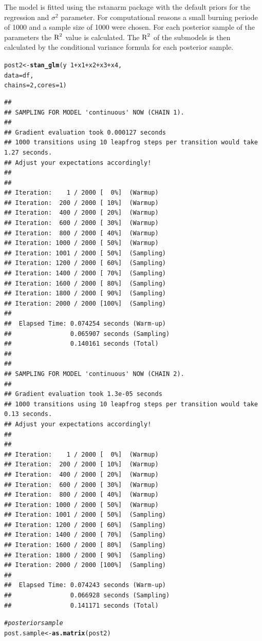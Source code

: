 \documentclass[11pt,a4paper,twoside]{book}\usepackage[]{graphicx}\usepackage[]{color}
\makeatletter
\newcommand{\hlnum}[1]{\textcolor[rgb]{0.686,0.059,0.569}{#1}}%
\newcommand{\hlcom}[1]{\textcolor[rgb]{0.678,0.584,0.686}{\textit{#1}}}%
\newcommand{\hlopt}[1]{\textcolor[rgb]{0,0,0}{#1}}%
\newcommand{\hlstd}[1]{\textcolor[rgb]{0.345,0.345,0.345}{#1}}%
\newcommand{\hlkwb}[1]{\textcolor[rgb]{0.69,0.353,0.396}{#1}}%
\newcommand{\hlkwc}[1]{\textcolor[rgb]{0.333,0.667,0.333}{#1}}%
\newcommand{\hlkwd}[1]{\textcolor[rgb]{0.737,0.353,0.396}{\textbf{#1}}}%
\newenvironment{kframe}{%
 \def\at@end@of@kframe{}%
 \ifinner\ifhmode%
  \def\at@end@of@kframe{\end{minipage}}%
  \begin{minipage}{\columnwidth}%
 \fi\fi%
 \def\FrameCommand##1{\hskip\@totalleftmargin \hskip-\fboxsep
 \colorbox{shadecolor}{##1}\hskip-\fboxsep
     \hskip-\linewidth \hskip-\@totalleftmargin \hskip\columnwidth}%
 \MakeFramed {\advance\hsize-\width
   \@totalleftmargin\z@ \linewidth\hsize
   \@setminipage}}%
 {\par\unskip\endMakeFramed%
 \at@end@of@kframe}
\newenvironment{knitrout}{}{} %
\makeatother
\begin{document}
The model is fitted using the rstanarm package with the default priors for the regression and $\sigma^2$ parameter. For computational reasons a small burning periode of 1000 and a sample size of 1000 were chosen. For each posterior sample of the parameters the $\text{R}^2$ value is calculated. The $\text{R}^2$ of the submodels is then calculated by the conditional variance formula for each posterior sample.


\begin{knitrout}
\color{fgcolor}\begin{kframe}
\begin{alltt}
\hlstd{post2} \hlkwb{<-} \hlkwd{stan_glm}\hlstd{(y} \hlopt{~} \hlnum{1} \hlopt{+} \hlstd{x1} \hlopt{+} \hlstd{x2} \hlopt{+} \hlstd{x3} \hlopt{+} \hlstd{x4,}
                  \hlkwc{data} \hlstd{= df,}
                  \hlkwc{chains} \hlstd{=} \hlnum{2}\hlstd{,} \hlkwc{cores} \hlstd{=} \hlnum{1}\hlstd{)}
\end{alltt}
\begin{verbatim}
## 
## SAMPLING FOR MODEL 'continuous' NOW (CHAIN 1).
## 
## Gradient evaluation took 0.000127 seconds
## 1000 transitions using 10 leapfrog steps per transition would take 1.27 seconds.
## Adjust your expectations accordingly!
## 
## 
## Iteration:    1 / 2000 [  0%]  (Warmup)
## Iteration:  200 / 2000 [ 10%]  (Warmup)
## Iteration:  400 / 2000 [ 20%]  (Warmup)
## Iteration:  600 / 2000 [ 30%]  (Warmup)
## Iteration:  800 / 2000 [ 40%]  (Warmup)
## Iteration: 1000 / 2000 [ 50%]  (Warmup)
## Iteration: 1001 / 2000 [ 50%]  (Sampling)
## Iteration: 1200 / 2000 [ 60%]  (Sampling)
## Iteration: 1400 / 2000 [ 70%]  (Sampling)
## Iteration: 1600 / 2000 [ 80%]  (Sampling)
## Iteration: 1800 / 2000 [ 90%]  (Sampling)
## Iteration: 2000 / 2000 [100%]  (Sampling)
## 
##  Elapsed Time: 0.074254 seconds (Warm-up)
##                0.065907 seconds (Sampling)
##                0.140161 seconds (Total)
## 
## 
## SAMPLING FOR MODEL 'continuous' NOW (CHAIN 2).
## 
## Gradient evaluation took 1.3e-05 seconds
## 1000 transitions using 10 leapfrog steps per transition would take 0.13 seconds.
## Adjust your expectations accordingly!
## 
## 
## Iteration:    1 / 2000 [  0%]  (Warmup)
## Iteration:  200 / 2000 [ 10%]  (Warmup)
## Iteration:  400 / 2000 [ 20%]  (Warmup)
## Iteration:  600 / 2000 [ 30%]  (Warmup)
## Iteration:  800 / 2000 [ 40%]  (Warmup)
## Iteration: 1000 / 2000 [ 50%]  (Warmup)
## Iteration: 1001 / 2000 [ 50%]  (Sampling)
## Iteration: 1200 / 2000 [ 60%]  (Sampling)
## Iteration: 1400 / 2000 [ 70%]  (Sampling)
## Iteration: 1600 / 2000 [ 80%]  (Sampling)
## Iteration: 1800 / 2000 [ 90%]  (Sampling)
## Iteration: 2000 / 2000 [100%]  (Sampling)
## 
##  Elapsed Time: 0.074243 seconds (Warm-up)
##                0.066928 seconds (Sampling)
##                0.141171 seconds (Total)
\end{verbatim}
\begin{alltt}
\hlcom{#posterior sample}
\hlstd{post.sample} \hlkwb{<-} \hlkwd{as.matrix}\hlstd{(post2)}


\end{alltt}
\end{kframe}
\end{knitrout}
\end{document}
